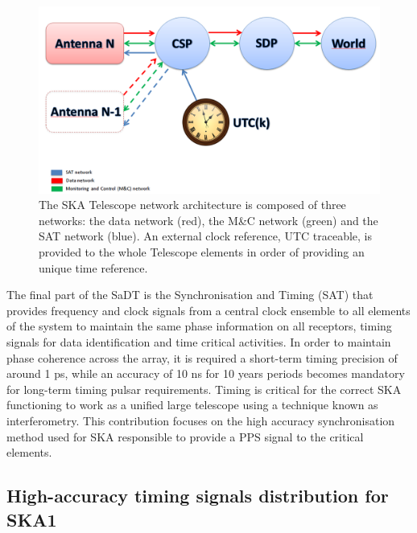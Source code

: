 \begin{figure}[H] \centering \includegraphics[scale=0.4]{img/ska_network_arch}
	\caption{The SKA Telescope network architecture is composed of three
	networks: the data network (red), the M\&C network (green) and the SAT
	network (blue). An external clock reference, UTC traceable, is provided
	to the whole Telescope elements in order of providing an unique time
	reference.} \label{fig:ska_net_arch1} \end{figure}

The final part of the SaDT is the Synchronisation and Timing (SAT) that
provides frequency and clock signals from a central clock ensemble to all
elements of the system to maintain the same phase information on all receptors, 
timing signals for data identification and time critical activities. 
In order to maintain phase coherence across the array, it is required a short-term 
timing precision of around 1 ps, while  an accuracy of 10 ns for 10 years periods 
becomes mandatory for long-term timing pulsar requirements. 
Timing is critical for the correct SKA functioning to
work as a unified large telescope using a technique known as interferometry.
This contribution focuses on the high accuracy synchronisation method used for
SKA responsible to provide a PPS signal to the critical elements. 

\FloatBarrier
\subsection{High-accuracy timing signals distribution for SKA1}
\label{subsec:ska-distribution}

